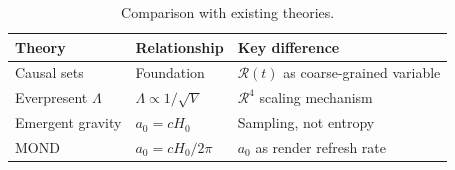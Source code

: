 \documentclass[12pt]{article}
\begin{document}
\begin{table}[H]
\centering
\caption{Comparison with existing theories.}
\begin{tabular}{lll}
\hline
Theory & Relationship & Key difference \\
\hline
Causal sets \citep{bombelli1987,dowker2013} & Foundation & $\mathcal{R}(t)$ as coarse-grained variable \\
Everpresent $\Lambda$ \citep{sorkin2005,ahmed2004} & $\Lambda\!\propto\!1/\sqrt{V}$ & $\mathcal{R}^4$ scaling mechanism \\
Emergent gravity \citep{verlinde2017} & $a_0 = cH_0$ & Sampling, not entropy \\
MOND \citep{milgrom1983} & $a_0 = cH_0/2\pi$ & $a_0$ as render refresh rate \\
\hline
\end{tabular}
\end{table}
\end{document}
